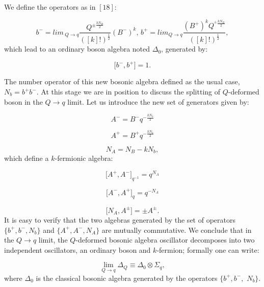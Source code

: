 \documentclass[a4paper,12pt,thmsa]{article}
\begin{document}
We define the operators as in $[18]$:

\begin{equation}
b^{-}=lim\, _{Q\rightarrow q}\frac{Q^{\pm
\frac{kN_B}2}}{([k]!)^{\frac
12}}(B^{-})^k,\, b^{+}=lim_{Q\rightarrow q}\frac{(B^{+})^kQ^{^{\pm }%
\frac{kN_B}2}}{([k]!)^{\frac 12}},
\end{equation}
which lead to an ordinary boson algebra noted $\Delta _0$, generated by:

\begin{equation}
\lbrack b^{-},b^{+}]=1.
\end{equation}

The number operator of this new bosonic algebra defined as the usual case, $%
N_b=b^{+}b^{-}$. At this stage we are in position to discuss the splitting
of $Q$-deformed boson in the $Q\rightarrow q$ limit. Let us introduce the
new set of generators given by:

\begin{equation}
A^{-}=B^{-}q^{-\frac{kN_b}2}
\end{equation}

\begin{equation}
A^{+}=B^{+}q^{-\frac{kN_b}2}
\end{equation}

\begin{equation}
N_A=N_B-kN_b,
\end{equation}
which define a $k$-fermionic algebra:

\begin{equation}
\lbrack A^{+},A^{-}]_{q^{-1}}=q^{N_A}
\end{equation}

\begin{equation}
\lbrack A^{-},A^{+}]_q=q^{-N_A}
\end{equation}

\begin{equation}
\lbrack N_A,A^{\pm }]=\pm A^{\pm }.
\end{equation}
It is easy to verify that the two algebras generated by the set of operators
$\{b^{+},b^{-},N_b\}$ and $\{A^{+},A^{-},N_A\}$ are mutually commutative. We
conclude that in the $Q\rightarrow q$ limit, the $Q$-deformed bosonic
algebra oscillator decomposes into two independent oscillators, an ordinary
boson and $k$-fermion; formally one can write:

\[
\lim_{Q\rightarrow q}\Delta _Q\equiv \Delta _0\otimes \Sigma _q,
\]
where $\Delta _0$ is the classical bosonic algebra generated by the
operators $\{b^{+},b^{-},$ $N_b\}.$
\end{document}
